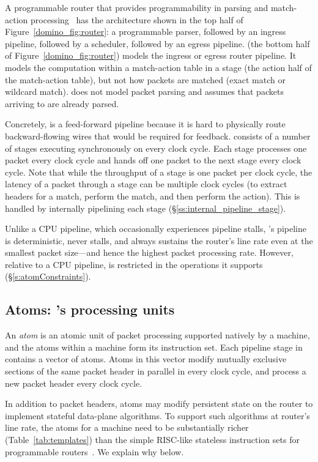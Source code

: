 A programmable router that provides programmability in parsing and match-action
processing~\cite{rmt, xpliant, flexpipe, tofino} has the architecture shown in
the top half of Figure~\ref{domino_fig:router}: a programmable parser, followed
by an ingress pipeline, followed by a scheduler, followed by an egress
pipeline.  \absmachine (the bottom half of Figure~\ref{domino_fig:router})
models the ingress or egress router pipeline.  It models the computation within
a match-action table in a stage (\ie the action half of the match-action
table), but not how packets are matched (\eg exact match or wildcard match).
\absmachine does not model packet parsing and assumes that packets arriving to
\absmachine are already parsed.

 Concretely, \absmachine is a feed-forward pipeline because it is hard to
physically route backward-flowing wires that would be required for feedback.
\absmachine consists of a number of stages executing synchronously on every
clock cycle.  Each stage processes one packet every clock cycle and hands off
one packet to the next stage every clock cycle. Note that while the throughput
of a stage is one packet per clock cycle, the latency of a packet through a
stage can be multiple clock cycles (to extract headers for a match, perform the
match, and then perform the action). This is handled by internally pipelining
each \absmachine stage (\S\ref{ss:internal_pipeline_stage}).

Unlike a CPU pipeline, which occasionally experiences pipeline stalls,
\absmachine's pipeline is deterministic, never stalls, and always sustains the
router's line rate even at the smallest packet size---and hence the highest
packet processing rate. However, relative to a CPU pipeline, \absmachine is
restricted in the operations it supports (\S\ref{s:atomConstraints}).

\subsection{Atoms: \absmachine's processing units}
\label{ss:atoms}
 An {\em atom} is an atomic unit of packet processing supported natively by a
\absmachine machine, and the atoms within a \absmachine machine form its
instruction set. Each pipeline stage in \absmachine contains a vector of atoms.
Atoms in this vector modify mutually exclusive sections of the same packet
header in parallel in every clock cycle, and process a new packet header every
clock cycle.

In addition to packet headers, atoms may modify persistent state on the router
to implement stateful data-plane algorithms. To support such algorithms at
router's line rate, the atoms for a \absmachine machine need to be
substantially richer (Table~\ref{tab:templates}) than the simple RISC-like
stateless instruction sets for programmable routers~\cite{rmt}. We explain why
below.

